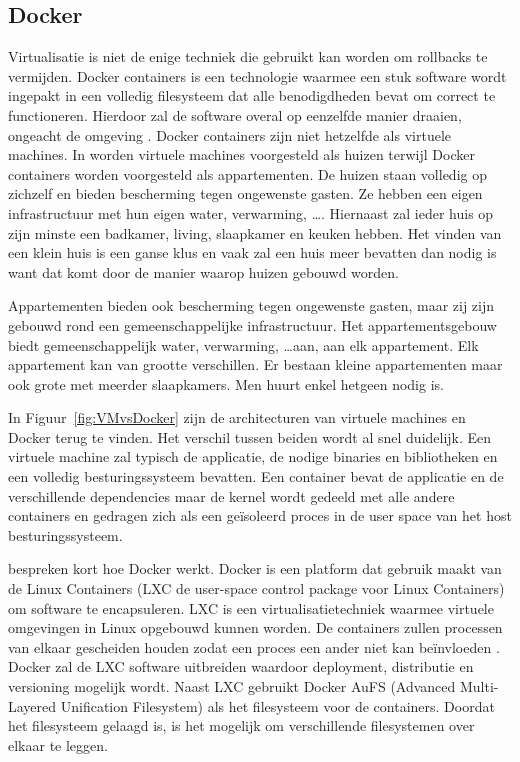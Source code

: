 \subsection{Docker}\label{sec:docker}
Virtualisatie is niet de enige techniek die gebruikt kan worden om rollbacks te vermijden.
Docker containers is een technologie waarmee een stuk software wordt ingepakt in een volledig filesysteem dat alle benodigdheden bevat om correct te functioneren.
Hierdoor zal de software overal op eenzelfde manier draaien, ongeacht de omgeving \citep{dockerMain}.
Docker containers zijn niet hetzelfde als virtuele machines.
In \citep{dockerEbook} worden virtuele machines voorgesteld als huizen terwijl Docker containers worden voorgesteld als appartementen.
De huizen staan volledig op zichzelf en bieden bescherming tegen ongewenste gasten.
Ze hebben een eigen infrastructuur met hun eigen water, verwarming, \ldots .
Hiernaast zal ieder huis op zijn minste een badkamer, living, slaapkamer en keuken hebben.
Het vinden van een klein huis is een ganse klus en vaak zal een huis meer bevatten dan nodig is want dat komt door de manier waarop huizen gebouwd worden.

Appartementen bieden ook bescherming tegen ongewenste gasten, maar zij zijn gebouwd rond een gemeenschappelijke infrastructuur.
Het appartementsgebouw biedt gemeenschappelijk water, verwarming, \ldots  aan, aan elk appartement.
Elk appartement kan van grootte verschillen.
Er bestaan kleine appartementen maar ook grote met meerder slaapkamers.
Men huurt enkel hetgeen nodig is.

In Figuur~\ref{fig:VMvsDocker} zijn de architecturen van virtuele machines en Docker terug te vinden.
Het verschil tussen beiden wordt al snel duidelijk.
Een virtuele machine zal typisch de applicatie, de nodige binaries en bibliotheken en een volledig besturingssysteem bevatten.
Een container bevat de applicatie en de verschillende dependencies maar de kernel wordt gedeeld met alle andere containers en gedragen zich als een geïsoleerd proces in de user space van het host besturingssysteem.

\citet{chamberlain2014using} bespreken kort hoe Docker werkt.
Docker is een platform dat gebruik maakt van de Linux Containers (LXC de user-space control package voor Linux Containers) om software te encapsuleren.
LXC is een virtualisatietechniek waarmee virtuele omgevingen in Linux opgebouwd kunnen worden.
De containers zullen processen van elkaar gescheiden houden zodat een proces een ander niet kan beïnvloeden \citep{merkel2014docker}.
Docker zal de LXC software uitbreiden waardoor deployment, distributie en versioning mogelijk wordt.
Naast LXC gebruikt Docker AuFS (Advanced Multi-Layered Unification Filesystem) als het filesysteem voor de containers.
Doordat het filesysteem gelaagd is, is het mogelijk om verschillende filesystemen over elkaar te leggen.

